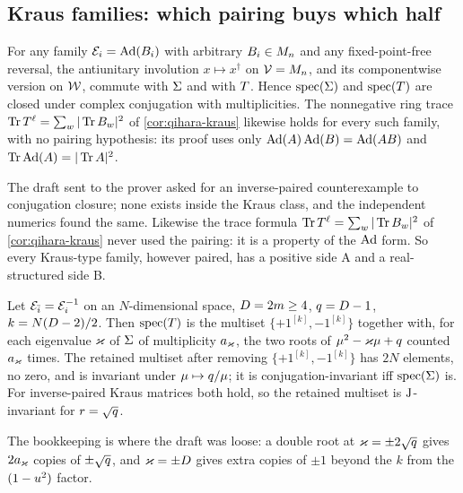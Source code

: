\subsection{Kraus families: which pairing buys which half}

\begin{proposition}
\label{prop:kraus-conjugation-symmetry}
For any family $\mathcal E_{i} = \operatorname{Ad}(B_i)$ with arbitrary $B_i\in M_n$ and any fixed-point-free
reversal, the antiunitary involution $x\mapsto x^\dagger$ on $\mathcal V = M_n$, and its
componentwise version on $\mathcal W$, commute with $\Sigma$ and with $T$. Hence
$\operatorname{spec}(\Sigma)$ and $\operatorname{spec}(T)$ are closed under complex
conjugation with multiplicities. The nonnegative ring trace $\operatorname{Tr}T^{\ell} =
\sum_w|\operatorname{Tr} B_w|^2$ of \cref{cor:qihara-kraus} likewise holds for every such family, with
no pairing hypothesis: its proof uses only $\operatorname{Ad}(A)\operatorname{Ad}(B) = \operatorname{Ad}(AB)$ and $\operatorname{Tr}\operatorname{Ad}(A) =
|\operatorname{Tr} A|^2$.
\end{proposition}

The draft sent to the prover asked for an inverse-paired counterexample to conjugation
closure; none exists inside the Kraus class, and the independent numerics found the same.
Likewise the trace formula $\operatorname{Tr}T^{\ell} = \sum_w|\operatorname{Tr} B_w|^2$ of \cref{cor:qihara-kraus}
never used the pairing: it is a property of the $\operatorname{Ad}$ form. So every Kraus-type family,
however paired, has a positive side A and a real-structured side B.

\begin{theorem}
\label{thm:kraus-inverse-pairing-duality}
Let $\mathcal E_{\bar{i}} = \mathcal E_{i}^{-1}$ on an $N$-dimensional space, $D = 2m\ge4$,
$q = D-1$, $k = N(D-2)/2$. Then $\operatorname{spec}(T)$ is the multiset
$\{+1^{[k]},-1^{[k]}\}$ together with, for each eigenvalue $\varkappa$ of $\Sigma$ of
multiplicity $a_\varkappa$, the two roots of $\mu^2-\varkappa\mu+q$ counted $a_\varkappa$
times. The retained multiset after removing $\{+1^{[k]},-1^{[k]}\}$ has $2N$ elements,
no zero, and is invariant under $\mu\mapsto q/\mu$; it is conjugation-invariant
iff $\operatorname{spec}(\Sigma)$ is. For inverse-paired Kraus matrices both hold, so the
retained multiset is $\mathrm{J}$-invariant for $r = \sqrt{q}$.
\end{theorem}

The bookkeeping is where the draft was loose: a double root at $\varkappa = \pm2\sqrt{q}$
gives $2a_\varkappa$ copies of $\pm\sqrt{q}$, and $\varkappa = \pm D$ gives extra copies of
$\pm1$ beyond the $k$ from the $(1-u^2)$ factor.

